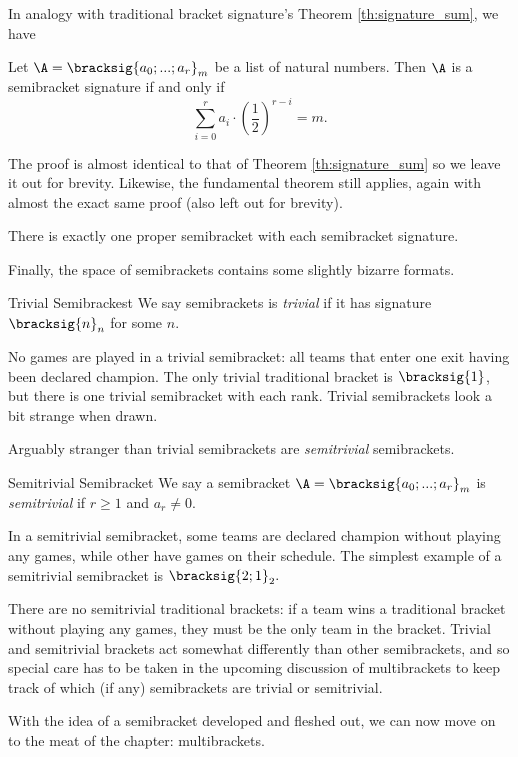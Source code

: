 {    In analogy with traditional bracket signature's Theorem \ref{th:signature_sum}, we have

    \begin{theorem}{}{}
        Let $\A = \bracksig{a_0; ...; a_r}_m$ be a list of natural numbers. Then $\A$ is a semibracket signature if and only if $$\sum_{i=0}^r a_i \cdot \left(\frac{1}{2}\right)^{r - i} = m.$$
    \end{theorem}

    The proof is almost identical to that of Theorem \ref{th:signature_sum} so we leave it out for brevity. Likewise, the fundamental theorem still applies, again with almost the exact same proof (also left out for brevity).

    \begin{theorem}{}{}
        There is exactly one proper semibracket with each semibracket signature.
    \end{theorem}

    Finally, the space of semibrackets contains some slightly bizarre formats.

    \begin{definition}{Trivial Semibrackest}{}
        We say semibrackets is \textit{trivial} if it has signature $\bracksig{n}_n$ for some $n$.
    \end{definition}

    No games are played in a trivial semibracket: all teams that enter one exit having been declared champion. The only trivial traditional bracket is $\bracksig{1}$, but there is one trivial semibracket with each rank. Trivial semibrackets look a bit strange when drawn.


    Arguably stranger than trivial semibrackets are \textit{semitrivial} semibrackets.

    \begin{definition}{Semitrivial Semibracket}{}
        We say a semibracket $\A = \bracksig{a_0; ...; a_r}_m$ is \textit{semitrivial} if $r \geq 1$ and $a_r \neq 0.$
    \end{definition}

    In a semitrivial semibracket, some teams are declared champion without playing any games, while other have games on their schedule. The simplest example of a semitrivial semibracket is $\bracksig{2;1}_2.$


    There are no semitrivial traditional brackets: if a team wins a traditional bracket without playing any games, they must be the only team in the bracket. Trivial and semitrivial brackets act somewhat differently than other semibrackets, and so special care has to be taken in the upcoming discussion of multibrackets to keep track of which (if any) semibrackets are trivial or semitrivial.

    With the idea of a semibracket developed and fleshed out, we can now move on to the meat of the chapter: multibrackets.
}